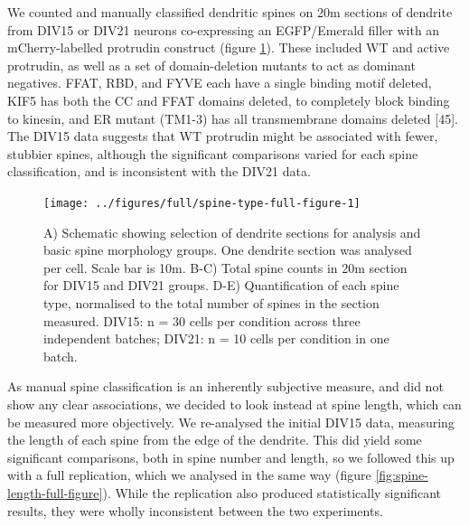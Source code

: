 \documentclass[
  12pt,
  a4paper,
]{book}
\begin{document}
We counted and manually classified dendritic spines on 20\textmu{}m sections of dendrite from DIV15 or DIV21 neurons co-expressing an EGFP/Emerald filler with an mCherry-labelled protrudin construct (figure \ref{fig:spine-type-full-figure}). These included WT and active protrudin, as well as a set of domain-deletion mutants to act as dominant negatives. \textDelta{}FFAT, \textDelta{}RBD, and \textDelta{}FYVE each have a single binding motif deleted, \textDelta{}KIF5 has both the CC and FFAT domains deleted, to completely block binding to kinesin, and \textDelta{}ER mutant (\textDelta{}TM1-3) has all transmembrane domains deleted {[}45{]}. The DIV15 data suggests that WT protrudin might be associated with fewer, stubbier spines, although the significant comparisons varied for each spine classification, and is inconsistent with the DIV21 data.


\begin{figure}
\texttt{[image: ../figures/full/spine-type-full-figure-1]} \caption[Protrudin effect on dendritic spine morphology]{A) Schematic showing selection of dendrite sections for analysis and basic spine morphology groups.  One dendrite section was analysed per cell.  Scale bar is 10\textmu{}m.  B-C) Total spine counts in 20\textmu{}m section for DIV15 and DIV21 groups.  D-E) Quantification of each spine type, normalised to the total number of spines in the section measured.  DIV15: n = 30 cells per condition across three independent batches; DIV21: n = 10 cells per condition in one batch.}\label{fig:spine-type-full-figure}
\end{figure}

\restoregeometry
{} %

As manual spine classification is an inherently subjective measure, and did not show any clear associations, we decided to look instead at spine length, which can be measured more objectively. We re-analysed the initial DIV15 data, measuring the length of each spine from the edge of the dendrite. This did yield some significant comparisons, both in spine number and length, so we followed this up with a full replication, which we analysed in the same way (figure \ref{fig:spine-length-full-figure}). While the replication also produced statistically significant results, they were wholly inconsistent between the two experiments.
\end{document}
